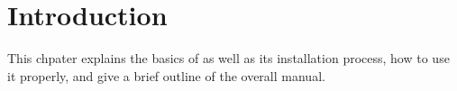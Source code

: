 \chapter{Introduction}\label{ch:Intro}
\begin{chapter_resume}
This chpater explains the basics of \ThesiX{} as well as its installation process, how to use it properly, and give a brief outline of the overall manual.
\end{chapter_resume}





